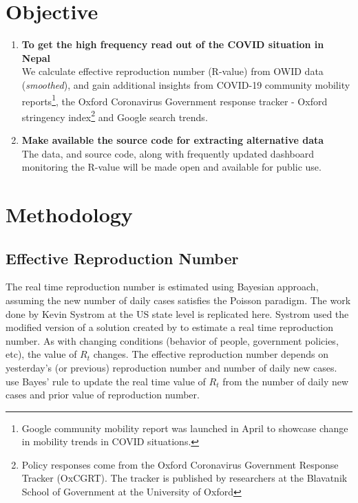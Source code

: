 \documentclass{article}
\begin{document}
\section{Objective}
\begin{enumerate}[label=(\alph*)]
  \item \textbf{To get the high frequency read out of the COVID situation in Nepal}\\
    We calculate effective reproduction number (R-value) from OWID data (\textit{smoothed})\cite{owidcoronavirus}, and gain additional insights from COVID-19 community mobility reports\footnote{Google community mobility report was launched in April to showcase change in mobility trends in COVID situations.}, the Oxford Coronavirus Government response tracker - Oxford stringency index\footnote{ Policy responses come from the Oxford Coronavirus Government Response Tracker (OxCGRT). The tracker is published by researchers at the Blavatnik School of Government at the University of Oxford\cite{hale2020variation}} and Google search trends.\cite{Google_trends}
  \item \textbf{Make available the source code for extracting alternative data}\\
  The data, and source code, along with frequently updated dashboard monitoring the R-value will be made open and available for public use.
\end{enumerate}

\section{Methodology}

\subsection{Effective Reproduction Number}
The real time reproduction number is estimated using Bayesian approach, assuming the new number of daily cases satisfies the Poisson paradigm. The work\cite{kevin_sys} done by Kevin Systrom at the US state level is replicated here. Systrom used the modified version of a solution created by \cite{bettencourt2008real} to estimate a real time reproduction number.
As with changing conditions (behavior of people, government policies, etc), the value of $R_t$ changes. The effective reproduction number depends on yesterday’s (or previous) reproduction number and number of daily new cases. \cite{bettencourt2008real} use Bayes’ rule to update the real time value of $R_t$ from the number of daily new cases and prior value of reproduction number.
\end{document}
